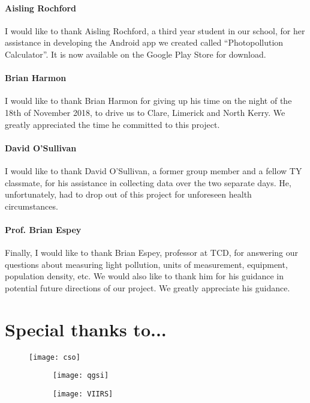 \paragraph{Aisling Rochford}
I would like to thank Aisling Rochford, a third year student in our school, for her assistance in developing the Android app we created called “Photopollution Calculator”. It is now available on the Google Play Store for download. 
\paragraph{Brian Harmon}
I would like to thank Brian Harmon for giving up his time on the night of the 18th of November 2018, to drive us to Clare, Limerick and North Kerry. We greatly appreciated the time he committed to this project.
\paragraph{David O'Sullivan}
I would like to thank David O’Sullivan, a former group member and a fellow TY classmate, for his assistance in collecting data over the two separate days. He, unfortunately, had to drop out of this project for unforeseen health circumstances. 
\paragraph{Prof. Brian Espey}
Finally, I would like to thank Brian Espey, professor at TCD, for answering our questions about measuring light pollution, units of measurement, equipment, population density, etc. We would also like to thank him for his guidance in potential future directions of our project. We greatly appreciate his guidance.

\section*{Special thanks to...}
\begin{figure}[H]
    \centering
    \texttt{[image: cso]}
\end{figure}
\begin{figure}[H]
    \centering
    \begin{subfigure}{.49\linewidth}
        \centering
        \texttt{[image: qgsi]}
    \end{subfigure}
    \hfill
    \begin{subfigure}{.49\linewidth}
        \centering
        \texttt{[image: VIIRS]}
    \end{subfigure}
\end{figure}
